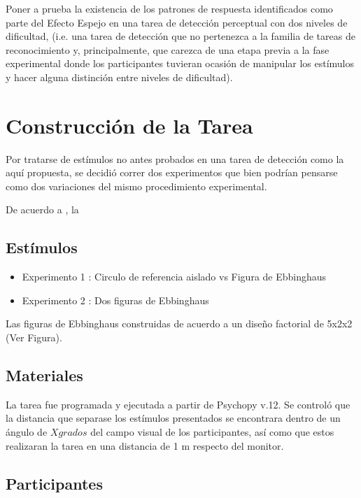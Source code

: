 Poner a prueba la existencia de los patrones de respuesta identificados como parte del Efecto Espejo en una tarea de detección perceptual con dos niveles de dificultad, (i.e. una tarea de detección que no pertenezca a la familia de tareas de reconocimiento y, principalmente, que carezca de una etapa previa a la fase experimental donde los participantes tuvieran ocasión de manipular los estímulos y hacer alguna distinción entre niveles de dificultad).


\section{Construcción de la Tarea}

Por tratarse de estímulos no antes probados en una tarea de detección como la aquí propuesta, se decidió correr dos experimentos que bien podrían pensarse como dos variaciones del mismo procedimiento experimental. 

De acuerdo a \parencite{Massaro1971}, la 

\subsection{Estímulos}

\begin{itemize}
\item Experimento 1 : Circulo de referencia aislado vs Figura de Ebbinghaus
\item Experimento 2 : Dos figuras de Ebbinghaus
\end{itemize}


Las figuras de Ebbinghaus construidas de acuerdo a un diseño factorial de 5x2x2 (Ver Figura). 

\subsection{Materiales}
La tarea fue programada y ejecutada a partir de Psychopy v.12. Se controló que la distancia que separase los estímulos presentados se encontrara dentro de un ángulo de $X grados$ del campo visual de los participantes, así como que estos realizaran la tarea en una distancia de 1 m respecto del monitor.

\subsection{Participantes}

